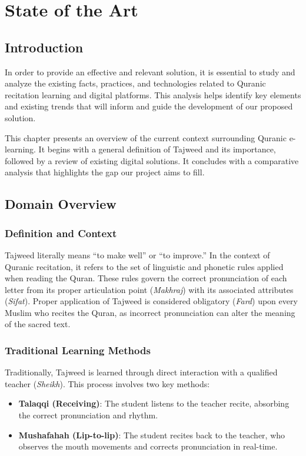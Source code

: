 \chapter{State of the Art}
\label{ch:state_of_art}

\section{Introduction}

In order to provide an effective and relevant solution, it is essential to study and analyze the existing facts, practices, and technologies related to Quranic recitation learning and digital platforms. This analysis helps identify key elements and existing trends that will inform and guide the development of our proposed solution.

This chapter presents an overview of the current context surrounding Quranic e-learning. It begins with a general definition of Tajweed and its importance, followed by a review of existing digital solutions. It concludes with a comparative analysis that highlights the gap our project aims to fill.

\section{Domain Overview}
\label{sec:soa_domain}

\subsection{Definition and Context}

\begin{emeraldbox}[title=Tajweed]
Tajweed literally means ``to make well'' or ``to improve.'' In the context of Quranic recitation, it refers to the set of linguistic and phonetic rules applied when reading the Quran. These rules govern the correct pronunciation of each letter from its proper articulation point (\textit{Makhraj}) with its associated attributes (\textit{Sifat}). Proper application of Tajweed is considered obligatory (\textit{Fard}) upon every Muslim who recites the Quran, as incorrect pronunciation can alter the meaning of the sacred text.
\end{emeraldbox}

\subsection{Traditional Learning Methods}
Traditionally, Tajweed is learned through direct interaction with a qualified teacher (\textit{Sheikh}). This process involves two key methods:
\begin{itemize}
  \item \textbf{Talaqqi (Receiving)}: The student listens to the teacher recite, absorbing the correct pronunciation and rhythm.
  \item \textbf{Mushafahah (Lip-to-lip)}: The student recites back to the teacher, who observes the mouth movements and corrects pronunciation in real-time.
\end{itemize}

